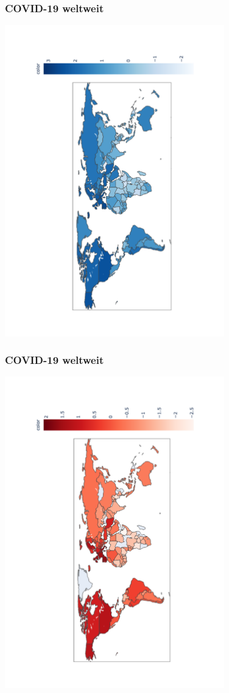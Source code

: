 \documentclass{beamer}
\begin{document}
 \begin{frame}
 	\frametitle{COVID-19 weltweit}
		\centering
		\includegraphics[width = 270pt, angle = -90]{map_confirmed.pdf}
 \end{frame}

 \begin{frame}
 	\frametitle{COVID-19 weltweit}
		\centering
		\includegraphics[width = 270pt, angle = -90]{map_death}
 \end{frame}
 
\end{document}
